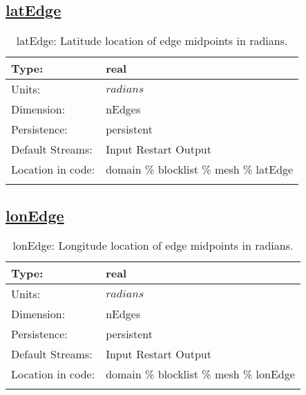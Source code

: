 \subsection[latEdge]{\hyperref[sec:var_tab_mesh]{latEdge}}
\label{subsec:var_sec_mesh_latEdge}
\begin{center}
\begin{longtable}{| p{2.0in} | p{4.0in} |}
        \hline 
        Type: & real \\
        \hline 
        Units: & $radians$ \\
        \hline 
        Dimension: & nEdges \\
        \hline 
        Persistence: & persistent \\
        \hline 
		 Default Streams: & Input Restart Output  \\
        \hline 
		 Location in code: & domain \% blocklist \% mesh \% latEdge \\
		 \hline 
    \caption{latEdge: Latitude location of edge midpoints in radians.}
\end{longtable}
\end{center}
\subsection[lonEdge]{\hyperref[sec:var_tab_mesh]{lonEdge}}
\label{subsec:var_sec_mesh_lonEdge}
\begin{center}
\begin{longtable}{| p{2.0in} | p{4.0in} |}
        \hline 
        Type: & real \\
        \hline 
        Units: & $radians$ \\
        \hline 
        Dimension: & nEdges \\
        \hline 
        Persistence: & persistent \\
        \hline 
		 Default Streams: & Input Restart Output  \\
        \hline 
		 Location in code: & domain \% blocklist \% mesh \% lonEdge \\
		 \hline 
    \caption{lonEdge: Longitude location of edge midpoints in radians.}
\end{longtable}
\end{center}
